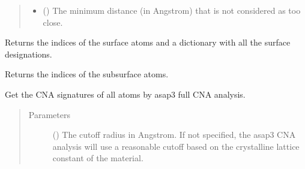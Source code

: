 \documentclass[letterpaper,10pt,english]{sphinxmanual}
\begin{document}
\begin{fulllineitems}
\begin{fulllineitems}
\begin{quote}
\begin{description}
\begin{itemize}
\item {} 
 () \textendash{} The minimum distance (in Angstrom) that is not considered
as too close.

\end{itemize}

\end{description}\end{quote}

\end{fulllineitems}


\begin{fulllineitems}
\label{\detokenize{modules:acat.adsorption_sites.ClusterAdsorptionSites.get_surface_sites}}
Returns the indices of the surface atoms and a dictionary
with all the surface designations.

\end{fulllineitems}


\begin{fulllineitems}
\label{\detokenize{modules:acat.adsorption_sites.ClusterAdsorptionSites.get_subsurface}}
Returns the indices of the subsurface atoms.

\end{fulllineitems}


\begin{fulllineitems}
\label{\detokenize{modules:acat.adsorption_sites.ClusterAdsorptionSites.get_fullCNA}}
Get the CNA signatures of all atoms by asap3 full CNA
analysis.
\begin{quote}\begin{description}
\item[{Parameters}] \leavevmode
{} (\sphinxstyleliteralemphasis{\sphinxupquote{, }}) \textendash{} The cutoff radius in Angstrom. If not specified, the
asap3 CNA analysis will use a reasonable cutoff based
on the crystalline lattice constant of the material.


\end{description}
\end{quote}
\end{fulllineitems}
\end{fulllineitems}
\end{document}
